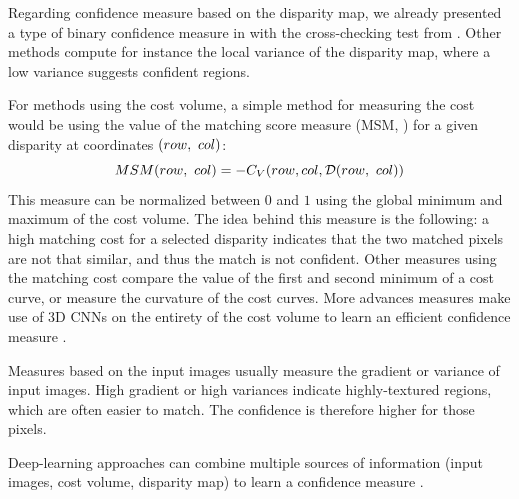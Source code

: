 \begin{example}\label{ex:confidence_measure}
    Regarding confidence measure based on the disparity map, we already presented a type of binary confidence measure in  with the cross-checking test from . Other methods compute for instance the local variance of the disparity map, where a low variance suggests confident regions.
    
    For methods using the cost volume, a simple method for measuring the cost would be using the value of the matching score measure (MSM, \cite{egnal_stereo_2004}) for a given disparity at coordinates $(row, ~col)$:
    \begin{equation}
        MSM(row, ~col) = -C_V(row, col, \mathcal{D}(row, ~col))
    \end{equation}
    This measure can be normalized between $0$ and $1$ using the global minimum and maximum of the cost volume. The idea behind this measure is the following: a high matching cost for a selected disparity indicates that the two matched pixels are not that similar, and thus the match is not confident. Other measures using the matching cost compare the value of the first and second minimum of a cost curve, or measure the curvature of the cost curves. More advances measures make use of 3D CNNs on the entirety of the cost volume to learn an efficient confidence measure \cite{mehltretter_cnn-based_2019}.
    
    Measures based on the input images usually measure the gradient \cite{haeusler_ensemble_2013} or variance \cite{park_learning_2019} of input images. High gradient or high variances indicate highly-textured regions, which are often easier to match. The confidence is therefore higher for those pixels. 
    
    Deep-learning approaches can combine multiple sources of information (input images, cost volume, disparity map) to learn a confidence measure \cite{tosi_beyond_2018, kim_adversarial_2020}.
\end{example}


